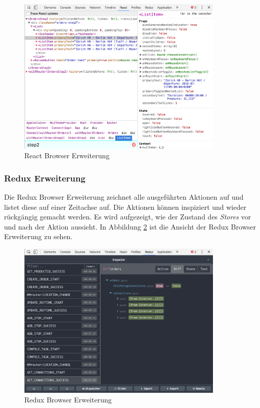 \begin{figure}[ht]
	\centering
  \includegraphics[width=0.88\textwidth]{images/reactext.png}
	\caption{React Browser Erweiterung}
	\label{fig:reactext}
\end{figure}

\subsubsection{Redux Erweiterung}
Die Redux Browser Erweiterung zeichnet alle ausgeführten Aktionen auf und listet diese auf einer Zeitachse auf. Die Aktionen können inspiziert und wieder rückgängig gemacht werden. Es wird aufgezeigt, wie der Zustand des \textit{Stores} vor und nach der Aktion aussieht. In Abbildung \ref{fig:reduxext} ist die Ansicht der Redux Browser Erweiterung zu sehen.

\begin{figure}[H]
	\centering
  \includegraphics[width=0.88\textwidth]{images/reduxext.png}
	\caption{Redux Browser Erweiterung}
	\label{fig:reduxext}
\end{figure}


